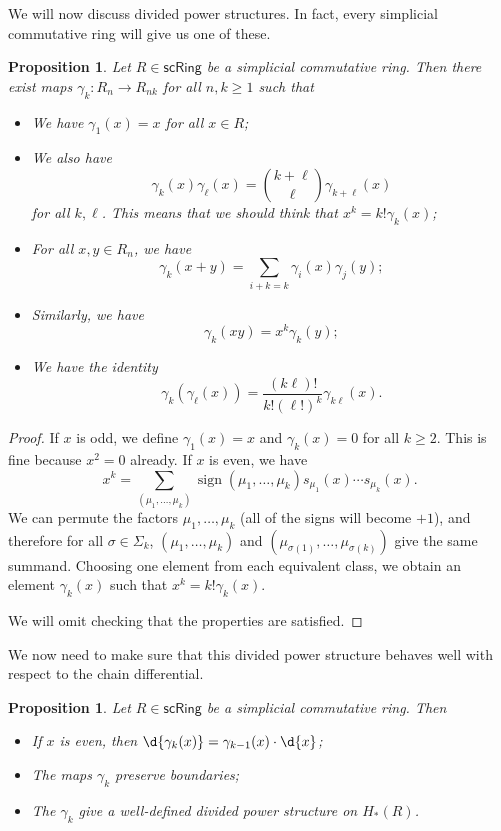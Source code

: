 \documentclass[10pt, oneside]{memoir}
\newtheorem{prop}[thm]{Proposition}
\theoremstyle{definition}
\theoremstyle{remark}
\theoremstyle{plain}
\theoremstyle{definition}
\theoremstyle{remark}
\newcommand{\on}[1]{\operatorname{#1}}
\newcommand{\ms}[1]{\mathsf{#1}}
\newcommand{\1}{\mathbf{1}}
\newcommand{\2}{\mathbf{2}}
\newcommand{\3}{\mathbf{3}}
\begin{document}
We will now discuss divided power structures. In fact, every simplicial commutative ring will give us one of these.

\begin{prop}
    Let \(R \in \ms{scRing} \) be a simplicial commutative ring. Then there exist maps \(\gamma_k \colon R_n \to R_{nk} \) for all \(n, k \geq 1 \) such that
    \begin{itemize}
        \item We have \(\gamma_1(x) = x \) for all \(x \in R \);
        \item We also have 
        \[ \gamma_k(x) \gamma_{\ell}(x) = \binom{k+\ell}{\ell} \gamma_{k+\ell}(x) \] 
        for all \(k, \ell \). This means that we should think that \(x^k = k! \gamma_k(x) \);
        \item For all \(x,y \in R_n \), we have
        \[ \gamma_k(x+y) = \sum_{i+k=k} \gamma_i(x) \gamma_j(y); \]
        \item Similarly, we have
        \[ \gamma_k(xy) = x^k \gamma_k(y); \]
        \item We have the identity
        \[ \gamma_k (\gamma_{\ell}(x)) = \frac{(k\ell)!}{k! (\ell!)^k} \gamma_{k\ell}(x). \]
    \end{itemize}
\end{prop}

\begin{proof}
    If \(x \) is odd, we define \(\gamma_1(x) = x \) and \(\gamma_k(x) = 0 \) for all \(k \geq 2 \). This is fine because \(x^2 = 0 \) already. If \(x \) is even, we have
    \[ x^k = \sum_{(\mu_1, \ldots, \mu_k)} \on{sign}(\mu_1, \ldots, \mu_k) s_{\mu_1}(x) \cdots s_{\mu_k}(x). \]
    We can permute the factors \(\mu_1, \ldots, \mu_k \) (all of the signs will become \(+1 \)), and therefore for all \(\sigma \in \Sigma_k \), \((\mu_1, \ldots, \mu_k) \) and \((\mu_{\sigma(1)}, \ldots, \mu_{\sigma(k)}) \) give the same summand. Choosing one element from each equivalent class, we obtain an element \(\gamma_k(x) \) such that \(x^k = k! \gamma_k(x) \).

    We will omit checking that the properties are satisfied.
\end{proof}

We now need to make sure that this divided power structure behaves well with respect to the chain differential.
\begin{prop}
    Let \(R \in \ms{scRing} \) be a simplicial commutative ring. Then
    \begin{itemize}
        \item If \(x \) is even, then \(\d{\gamma_k(x)} = \gamma_{k-1}(x)\cdot \d{x} \);
        \item The maps \(\gamma_k \) preserve boundaries;
        \item The \(\gamma_k \) give a well-defined divided power structure on \(H_*(R) \).
    \end{itemize}
\end{prop}
\end{document}

